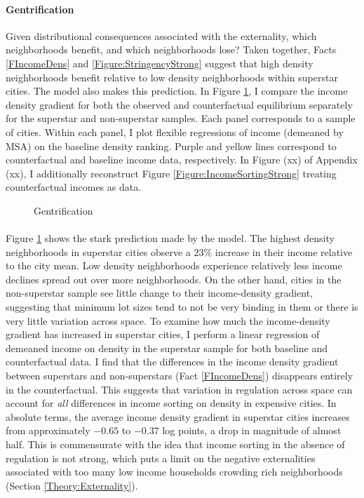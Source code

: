 \documentclass[11pt]{article}
\begin{document}
\paragraph*{Gentrification} Given distributional consequences associated with the externality, which neighborhoods benefit, and which neighborhoods lose? Taken together, Facts \ref{FIncomeDens} and \ref{Figure:StringencyStrong} suggest that high density neighborhoods benefit relative to low density neighborhoods within superstar cities. The model also makes this prediction. In Figure \ref{figure:gentrification}, I compare the income density gradient for both the observed and counterfactual equilibrium separately for the superstar and non-superstar samples. Each panel corresponds to a sample of cities. Within each panel, I plot flexible regressions of income (demeaned by MSA) on the baseline density ranking. Purple and yellow lines correspond to counterfactual and baseline income data, respectively. In Figure (xx) of Appendix (xx), I additionally reconstruct Figure \ref{Figure:IncomeSortingStrong} treating counterfactual incomes as data.

\begin{figure}[htbp!]
	
	
	\caption{Gentrification}\label{figure:gentrification}
	
\end{figure}

\paragraph*{}
Figure \ref{figure:gentrification} shows the stark prediction made by the model. The highest density neighborhoods in superstar cities observe a $23\%$ increase in their income relative to the city mean. Low density neighborhoods experience relatively less income declines spread out over more neighborhoods. On the other hand, cities in the non-superstar sample see little change to their income-density gradient, suggesting that minimum lot sizes tend to not be very binding in them or there is very little variation across space. To examine how much the income-density gradient has increased in superstar cities, I perform a linear regression of demeaned income on density in the superstar sample for both baseline and counterfactual data. I find that the differences in the income density gradient between superstars and non-superstars (Fact \ref{FIncomeDens}) disappears entirely in the counterfactual. This suggests that variation in regulation across space can account for \textit{all} differences in income sorting on density in expensive cities. In absolute terms, the average income density gradient in superstar cities increases from approximately $-0.65$ to $-0.37$ log points, a drop in magnitude of almost half. This is commensurate with the idea that income sorting in the absence of regulation is not strong, which puts a limit on the negative externalities associated with too many low income households crowding rich neighborhoods (Section \ref{Theory:Externality}). 
\end{document}
